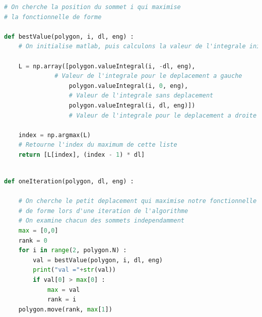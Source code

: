 \documentclass[a4paper,reqno]{article}
\begin{document}
\begin{lstlisting}[language=Python,frame=single,caption=Trouver le meilleur déplacement]
# On cherche la position du sommet i qui maximise
# la fonctionnelle de forme 

def bestValue(polygon, i, dl, eng) :        
    # On initialise matlab, puis calculons la valeur de l'integrale initiale 
        
    L = np.array([polygon.valueIntegral(i, -dl, eng),             		
    		  # Valeur de l'integrale pour le deplacement a gauche 
                  polygon.valueIntegral(i, 0, eng),               		
                  # Valeur de l'integrale sans deplacement 
                  polygon.valueIntegral(i, dl, eng)])             		
                  # Valeur de l'integrale pour le deplacement a droite 

    index = np.argmax(L)                                          		
    # Retourne l'index du maximum de cette liste
    return [L[index], (index - 1) * dl]               
    
\end{lstlisting}


\begin{lstlisting}[language=Python,frame=single,caption=Boucle principale de l'algorithme]
def oneIteration(polygon, dl, eng) : 
    
    # On cherche le petit deplacement qui maximise notre fonctionnelle 
    # de forme lors d'une iteration de l'algorithme 
    # On examine chacun des sommets independamment
    max = [0,0] 
    rank = 0 
    for i in range(2, polygon.N) : 
        val = bestValue(polygon, i, dl, eng)
        print("val ="+str(val))
        if val[0] > max[0] :
            max = val
            rank = i 
    polygon.move(rank, max[1])   
\end{lstlisting}
\end{document}
